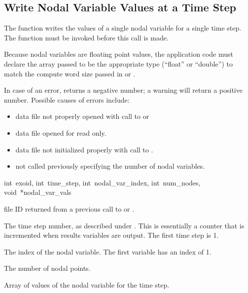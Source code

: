 \subsection{Write Nodal Variable Values at a Time Step}

The function  writes the values of a single
nodal variable for a single time step. The function
 must be invoked before this call is made.

Because nodal variables are floating point values, the application
code must declare the array passed to be the appropriate type
(``float'' or ``double'') to match the compute word size passed in
 or .

In case of an error,  returns a negative
number; a warning will return a positive number. Possible causes of
errors include:

\begin{itemize}
 \item data file not properly opened with call to 
 or 

 \item data file opened for read only.

 \item data file not initialized properly with call to
 .

 \item {} not called previously specifying
 the number of nodal variables.
\end{itemize}

{int~exoid,
int~time_step,
int~nodal_var_index,
int~num_nodes,
void~*nodal_var_vals}

\begin{parameters}
\item[{int exoid \R{}}]
\exo{} file ID returned from a previous call to  or
.

\item[{int time_step \R{}}]
The time step number, as described under . This
is essentially a counter that is incremented when results variables
are output. The first time step is 1.

\item[{int nodal_var_index \R{}}]
The index of the nodal variable. The first variable has an index of 1.

\item[{int num_nodes \R{}}]
 The number of nodal points.

\item[{void* nodal_var_vals \R{}}]
Array of  values of the \th{} nodal
variable for the \th{} time step.
\end{parameters}

